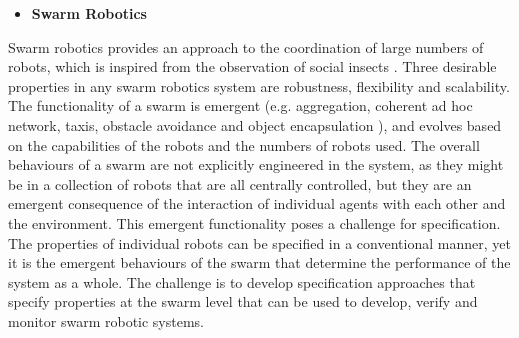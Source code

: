 \documentclass[sigconf,nonacm]{acmart}%
\begin{document}
\begin{itemize}[leftmargin=0.5cm]
	\item \textbf{Swarm Robotics}
\end{itemize}
Swarm robotics provides an approach to the coordination of large numbers of robots, which is inspired from the observation of social insects \cite{Sahin2005}. Three desirable properties in any swarm robotics system are robustness, flexibility and scalability. 
The functionality of a swarm is emergent (e.g. aggregation, coherent ad hoc network, taxis, obstacle avoidance and object encapsulation \cite{Winfield2006}), and evolves based on the capabilities of the robots and the numbers of robots used. 
The overall behaviours of a swarm are not explicitly engineered in the system, as they might be in a collection of robots that are all centrally controlled, but they are an emergent consequence of the interaction of individual agents with each other and the environment.
This emergent functionality poses a challenge for specification. The properties of individual robots can be specified in a conventional manner, yet it is the emergent behaviours of the swarm that determine the performance of the system as a whole. The challenge is to develop specification approaches that specify properties at the swarm level that can be used to develop, verify and monitor swarm robotic systems.
\end{document}
